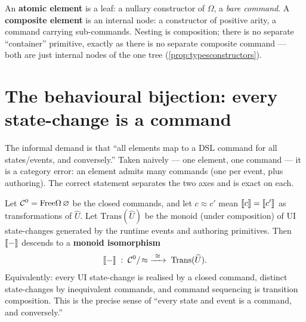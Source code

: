 \documentclass[../uxoxo-main]{subfiles}
\begin{document}
\begin{remark}\label{rem:atomic}
An \textbf{atomic element} is a leaf: a nullary constructor of $\Omega$, a
\emph{bare command}. A \textbf{composite element} is an internal node: a constructor
of positive arity, a command carrying sub-commands. Nesting is composition; there
is no separate ``container'' primitive, exactly as there is no separate composite
command --- both are just internal nodes of the one tree (\cref{prop:typesconstructors}).
\end{remark}

\section{The behavioural bijection: every state-change is a command}\label{sec:bijection}
The informal demand is that ``all elements map to a DSL command for all
states/events, and conversely.'' Taken naively --- one element, one command --- it
is a category error: an element admits many commands (one per event, plus
authoring). The correct statement separates the two axes and is exact on each.

\begin{theorem}\label{thm:bijection}
Let $\mathcal C^{0}=\mathrm{Free}\Omega\,\varnothing$ be the closed commands, and let
$c\approx c'$ mean $\llbracket c \rrbracket=\llbracket c' \rrbracket$ as transformations of $\widehat U$. Let
$\mathrm{Trans}(\widehat U)$ be the monoid (under composition) of UI
state-changes generated by the runtime events and authoring primitives. Then
$\llbracket - \rrbracket$ descends to a \textbf{monoid isomorphism}
\[
  \llbracket - \rrbracket \;:\; \mathcal C^{0}/\!\approx \;\xrightarrow{\ \cong\ }\; \mathrm{Trans}(\widehat U).
\]
Equivalently: every UI state-change is realised by a closed command, distinct
state-changes by inequivalent commands, and command sequencing is transition
composition. This is the precise sense of ``every state and event is a command,
and conversely.''
\end{theorem}
\end{document}
